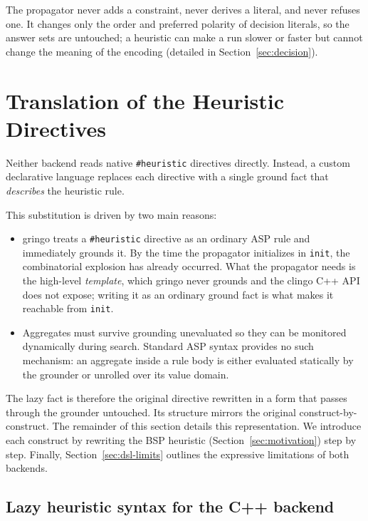 The propagator never adds a constraint, never derives a literal, and never refuses one. It changes only the order and preferred polarity of decision literals, so the answer sets are untouched; a heuristic can make a run slower or faster but cannot change the meaning of the encoding (detailed in Section~\ref{sec:decision}).

\section{Translation of the Heuristic Directives}
\label{sec:dsl}

Neither backend reads native \texttt{\#heuristic} directives directly. Instead, a custom declarative language replaces each directive with a single ground fact that \emph{describes} the heuristic rule.

This substitution is driven by two main reasons:
\begin{itemize}[leftmargin=1.5em, itemsep=2pt]
    \item gringo treats a \texttt{\#heuristic} directive as an ordinary ASP rule and immediately grounds it. By the time the propagator initializes in \texttt{init}, the combinatorial explosion has already occurred. What the propagator needs is the high-level \emph{template}, which gringo never grounds and the clingo C++ API does not expose; writing it as an ordinary ground fact is what makes it reachable from \texttt{init}.
    \item Aggregates must survive grounding unevaluated so they can be monitored dynamically during search. Standard ASP syntax provides no such mechanism: an aggregate inside a rule body is either evaluated statically by the grounder or unrolled over its value domain.
\end{itemize}

The lazy fact is therefore the original directive rewritten in a form that passes through the grounder untouched. Its structure mirrors the original construct-by-construct. 
The remainder of this section details this representation. We introduce each construct by rewriting the BSP heuristic (Section~\ref{sec:motivation}) step by step. Finally, Section~\ref{sec:dsl-limits} outlines the expressive limitations of both backends.

\subsection{Lazy heuristic syntax for the C++ backend}

